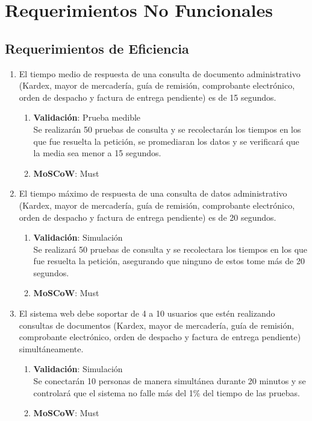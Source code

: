 \documentclass{scrreprt}
\begin{document}
\chapter{Requerimientos No Funcionales}

\section{Requerimientos de Eficiencia}

\begin{enumerate}


    \item El tiempo medio de respuesta de una consulta de documento administrativo (Kardex, mayor de mercadería, guía de remisión, comprobante electrónico, orden de despacho y factura de entrega pendiente) es de 15 segundos. 
    \begin{enumerate}
        \item \textbf{Validación}: Prueba medible\\
           Se realizarán 50 pruebas de consulta y se recolectarán los tiempos en los que fue resuelta la petición, se promediaran los datos y se verificará que la media sea menor a 15 segundos.
        \item \textbf{MoSCoW}: Must
    \end{enumerate}
    
    \item El tiempo máximo de respuesta de una consulta de datos administrativo (Kardex, mayor de mercadería, guía de remisión, comprobante electrónico, orden de despacho y factura de entrega pendiente) es de 20 segundos.  
    \begin{enumerate}
        \item \textbf{Validación}: Simulación\\
        Se realizará 50 pruebas de consulta y se recolectara los tiempos en los que fue resuelta la petición, asegurando que ninguno de estos tome más de 20 segundos.
        \item \textbf{MoSCoW}: Must
    \end{enumerate}
    
    \item El sistema web debe soportar de 4 a 10 usuarios que estén realizando consultas de documentos (Kardex, mayor de mercadería, guía de remisión, comprobante electrónico, orden de despacho y factura de entrega pendiente) simultáneamente.
    \begin{enumerate}
        \item \textbf{Validación}: Simulación\\
        Se conectarán 10 personas de manera simultánea durante 20 minutos y se controlará que el sistema no falle más del 1\% del tiempo de las pruebas.
        \item \textbf{MoSCoW}: Must
    \end{enumerate}
    

\end{enumerate}
\end{document}
